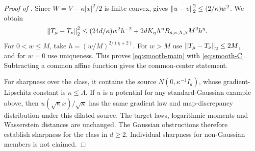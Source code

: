 \documentclass[11pt]{article}
\numberwithin{equation}{section}
\theoremstyle{remark}\newtheorem{remark}[theorem]{Remark}
\begin{document}
\begin{proof}[Proof of ]
Since $W=V-\kappa|x|^2/2$ is finite convex,  gives $\left\lVert u-v\right\rVert_2^2\le(2/\kappa)w^2$. We obtain
\[
 \left\lVert T_\mu-T_\nu\right\rVert_2^2
 \le(24d/\kappa)w^2h^{-2}
       +2dK_\eta\Lambda^\eta B_{d,\kappa,\Lambda,\beta}M^2h^\eta.
\]
For $0<w\le M$, take $h=(w/M)^{2/(\eta+2)}$. For $w>M$ use $\left\lVert T_\mu-T_\nu\right\rVert_2\le2M$, and for $w=0$ use uniqueness. This proves \eqref{eq:smooth-main} with \eqref{eq:smooth-C}. Subtracting a common affine function gives the common-center statement.

For sharpness over the class, it contains the source $N(0,\kappa^{-1}I_d)$, whose gradient-Lipschitz constant is $\kappa\le\Lambda$. If $u$ is a potential for any standard-Gaussian example above, then $u(\sqrt\kappa x)/\sqrt\kappa$ has the same gradient law and map-discrepancy distribution under this dilated source. The target laws, logarithmic moments and Wasserstein distances are unchanged. The Gaussian obstructions therefore establish sharpness for the class in $d\ge2$. Individual sharpness for non-Gaussian members is not claimed.
\end{proof}
\end{document}
